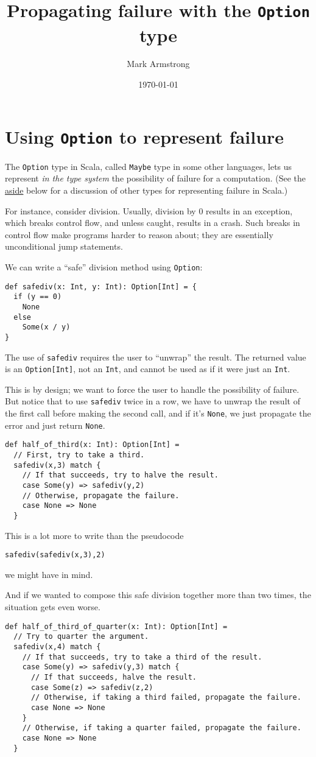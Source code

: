 \documentclass[11pt]{article}
\author{Mark Armstrong}
\date{\today}
\title{Propagating failure with the \texttt{Option} type}
\begin{document}
\maketitle
\tableofcontents


\section{Using \texttt{Option} to represent failure}
\label{sec:orge65a92c}
The \texttt{Option} type in Scala, called \texttt{Maybe} type in some other languages,
lets us represent \emph{in the type system} the possibility of failure
for a computation.
(See the \hyperref[sec:org3860b46]{aside} below for a discussion
 of other types for representing failure in Scala.)

For instance, consider division. Usually, division by 0 results
in an exception, which breaks control flow, and unless caught,
results in a crash. Such breaks in control flow make programs
harder to reason about; they are essentially unconditional jump statements.

We can write a “safe” division method using \texttt{Option}:
\begin{verbatim}
def safediv(x: Int, y: Int): Option[Int] = {
  if (y == 0)
    None
  else
    Some(x / y)
}
\end{verbatim}
The use of \texttt{safediv} requires the user to “unwrap” the result.
The returned value is an \texttt{Option[Int]}, not an \texttt{Int},
and cannot be used as if it were just an \texttt{Int}.

This is by design; we want to force the user to handle
the possibility of failure.
But notice that to use \texttt{safediv} twice in a row, we have to unwrap
the result of the first call before making the second call,
and if it's \texttt{None}, we just propagate the error
and just return \texttt{None}.
\begin{verbatim}
def half_of_third(x: Int): Option[Int] =
  // First, try to take a third.
  safediv(x,3) match {
    // If that succeeds, try to halve the result.
    case Some(y) => safediv(y,2)
    // Otherwise, propagate the failure.
    case None => None
  }
\end{verbatim}
This is a lot more to write than the pseudocode
\begin{verbatim}
safediv(safediv(x,3),2)
\end{verbatim}
we might have in mind.

And if we wanted to compose this safe division together
more than two times, the situation gets even worse.
\begin{verbatim}
def half_of_third_of_quarter(x: Int): Option[Int] =
  // Try to quarter the argument.
  safediv(x,4) match {
    // If that succeeds, try to take a third of the result.
    case Some(y) => safediv(y,3) match {
      // If that succeeds, halve the result.
      case Some(z) => safediv(z,2)
      // Otherwise, if taking a third failed, propagate the failure.
      case None => None
    }
    // Otherwise, if taking a quarter failed, propagate the failure.
    case None => None
  }
\end{verbatim}
\end{document}
